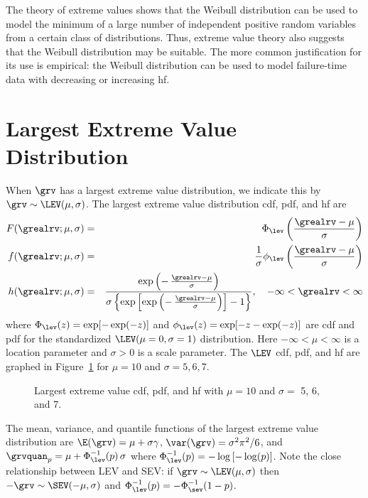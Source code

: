 The theory of extreme values shows that the Weibull distribution can
be used to model the minimum of a large number of independent positive
random variables from a certain class of distributions. Thus, extreme value
theory also suggests that
the Weibull distribution may be suitable.  The more common 
justification for its use is
empirical: the Weibull distribution can be used to model
failure-time data with decreasing or increasing hf. 

\section{Largest Extreme Value Distribution}
When $\grv$ has a largest extreme value distribution, we indicate this
by $ \grv \sim \LEV(\mu, \sigma)$. The largest extreme value
distribution cdf, pdf, and hf are
\begin{eqnarray*}  
F(\grealrv;\mu, \sigma)&=&
\Phi_{\lev}\left (\frac{\grealrv-\mu}{\sigma}
\right )
\\
 f(\grealrv;\mu, \sigma)&=&\frac{1}{ \sigma } \phi_{\lev}
\left ( 
\frac{\grealrv-\mu}{\sigma} \right)
\\
h(\grealrv;\mu, \sigma)&=& \frac{\exp
        \left (
        -\,\frac{\grealrv-\mu}{\sigma}
        \right )
      }
{ \sigma  \left \{
           \exp 
          \left [
           \exp
          \left (
           -\,\frac{\grealrv-\mu}{\sigma}
          \right )
          \right ]
            -1
          \right \}
}, \quad  -\infty < \grealrv < \infty
 \end{eqnarray*} 
where 
$\Phi_{\lev}(z)=\exp[-\exp(-z)]$ 
and
$\phi_{\lev}(z)=\exp[-z-\exp(-z)]$
are cdf and pdf for the
standardized $\LEV(\mu=0, \sigma=1)$ distribution. Here 
$-\infty <\mu < \infty$ is a location parameter and
$\sigma > 0$ is a scale parameter.
The $\LEV$ cdf, pdf, and hf are graphed in Figure~\ref{figure:distplot.lev.ps}
for $\mu=10$ and $\sigma=5,6,7$.

\begin{figure}
\caption{Largest extreme value 
cdf, pdf, and hf with  $\mu=10$ and
 $\sigma=$ 5, 6, and 7.}
\label{figure:distplot.lev.ps}
\end{figure}

The mean, variance, and quantile functions of the 
largest extreme value distribution are
$\E(\grv)= \mu + \sigma \gamma$,
$\var(\grv)= \sigma^{2} \pi^{2}/6$, and
$\grvquan_{p}=\mu + \Phi^{-1}_{\lev}(p) \, \sigma$
where $\Phi^{-1}_{\lev}(p)=
-\log \left [-\log(p) \right]$.
Note the close relationship between LEV and SEV: if $\grv \sim
\LEV(\mu, \sigma)$ then $-\grv \sim
\SEV(-\mu, \sigma)$ and $\Phi^{-1}_{\lev}(p) = -\Phi^{-1}_{\sev}(1-p)$.

